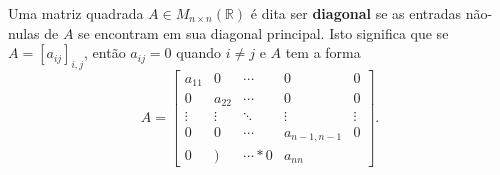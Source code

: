 Uma matriz quadrada $A\in M_{n\times n}(\mathbb{R})$ é dita ser \textbf{diagonal} se as entradas não-nulas de $A$ se encontram em sua diagonal principal. Isto significa que se $A=[a_{ij}]_{i,j}$, então $a_{ij}=0$ quando $i\neq j$ e $A$ tem a forma
\[A=\begin{bmatrix}
a_{11} & 0 & \cdots & 0 & 0\\
0 & a_{22} & \cdots & 0 & 0\\
\vdots & \vdots & \ddots & \vdots & \vdots\\
0 & 0 & \cdots & a_{n-1,n-1} & 0\\
0 & ) & \cdots * 0 & a_{nn}\end{bmatrix}.\]